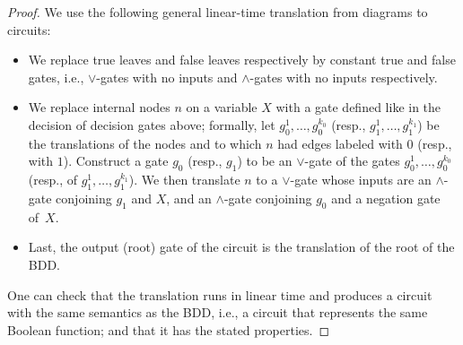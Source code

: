 \begin{proof}
  We use the following general linear-time translation
from diagrams to circuits:
\begin{itemize}
  \item We replace true
leaves and false leaves respectively by
constant true and false gates, i.e.,
$\lor$-gates with no inputs and $\land$-gates
with no inputs respectively.
    \item We replace
internal nodes $n$ on a variable $X$ with a
gate defined like in the decision of decision
gates above; formally, let $g^1_0,\ldots, g^{k_0}_0$ (resp., $g^1_1,\ldots, g^{k_1}_1$)
be the translations of the nodes and
to which $n$ had edges labeled
with $0$ (resp., with $1$).
Construct a gate $g_0$ (resp., $g_1$) to be an $\lor$-gate of the gates $g^1_0,\ldots, g^{k_0}_0$ (resp., of $g^1_1,\ldots, g^{k_1}_1$).
We then translate
$n$ to a $\lor$-gate whose inputs are an
$\land$-gate conjoining $g_1$ and $X$,
and an $\land$-gate conjoining $g_0$
and a negation gate of~$X$.
    \item Last, the output (root) gate of the
circuit is the translation of the root of the
BDD.
\end{itemize}

One can check that the translation runs in
linear time and produces a circuit with the
same semantics as the BDD, i.e., a circuit that represents the same
  Boolean function; and that it has the stated properties. 
% 
\end{proof}


